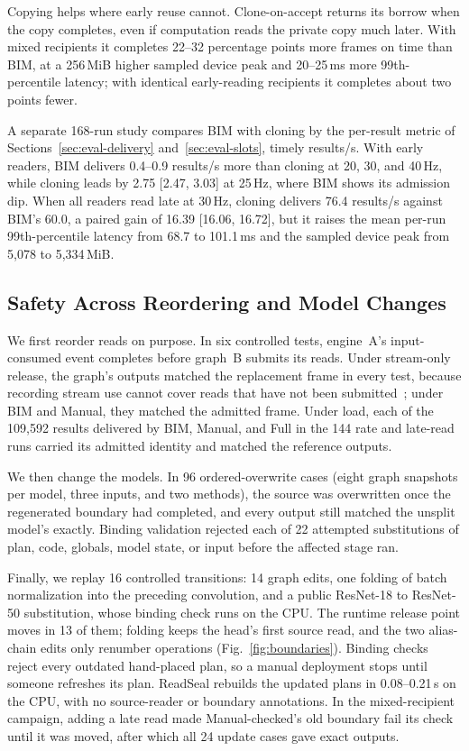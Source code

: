 \documentclass[conference]{IEEEtran}
\newcommand{\MiB}{\,MiB}
\newcommand{\ms}{\,ms}
\newcommand{\Hz}{\,Hz}
\begin{document}
Copying helps where early reuse cannot. Clone-on-accept returns its borrow when the copy completes, even if computation reads the private copy much later. With mixed recipients it completes 22--32 percentage points more frames on time than BIM, at a 256\MiB{} higher sampled device peak and 20--25\ms{} more 99th-percentile latency; with identical early-reading recipients it completes about two points fewer.

A separate 168-run study compares BIM with cloning by the per-result metric of Sections~\ref{sec:eval-delivery} and~\ref{sec:eval-slots}, timely results/s. With early readers, BIM delivers 0.4--0.9 results/s more than cloning at 20, 30, and 40\Hz, while cloning leads by 2.75 [2.47, 3.03] at 25\Hz, where BIM shows its admission dip. When all readers read late at 30\Hz, cloning delivers 76.4 results/s against BIM's 60.0, a paired gain of 16.39 [16.06, 16.72], but it raises the mean per-run 99th-percentile latency from 68.7 to 101.1\ms{} and the sampled device peak from 5,078 to 5,334\MiB.

\subsection{Safety Across Reordering and Model Changes}
\label{sec:eval-safety}

We first reorder reads on purpose. In six controlled tests, engine~A's input-consumed event completes before graph~B submits its reads. Under stream-only release, the graph's outputs matched the replacement frame in every test, because recording stream use cannot cover reads that have not been submitted~\cite{recordstream}; under BIM and Manual, they matched the admitted frame. Under load, each of the 109,592 results delivered by BIM, Manual, and Full in the 144 rate and late-read runs carried its admitted identity and matched the reference outputs.

We then change the models. In 96 ordered-overwrite cases (eight graph snapshots per model, three inputs, and two methods), the source was overwritten once the regenerated boundary had completed, and every output still matched the unsplit model's exactly. Binding validation rejected each of 22 attempted substitutions of plan, code, globals, model state, or input before the affected stage ran.

Finally, we replay 16 controlled transitions: 14 graph edits, one folding of batch normalization into the preceding convolution, and a public ResNet-18 to ResNet-50 substitution, whose binding check runs on the CPU. The runtime release point moves in 13 of them; folding keeps the head's first source read, and the two alias-chain edits only renumber operations (Fig.~\ref{fig:boundaries}). Binding checks reject every outdated hand-placed plan, so a manual deployment stops until someone refreshes its plan. ReadSeal rebuilds the updated plans in 0.08--0.21\,s on the CPU, with no source-reader or boundary annotations. In the mixed-recipient campaign, adding a late read made Manual-checked's old boundary fail its check until it was moved, after which all 24 update cases gave exact outputs.
\end{document}
